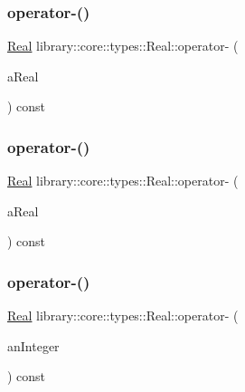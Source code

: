 \subsubsection{\texorpdfstring{operator-\/()}{operator-()}\hspace{0.1cm}{\footnotesize\ttfamily [1/4]}}
{\footnotesize\ttfamily \hyperlink{classlibrary_1_1core_1_1types_1_1_real}{Real} library\+::core\+::types\+::\+Real\+::operator-\/ (\begin{DoxyParamCaption}\item[{const \hyperlink{classlibrary_1_1core_1_1types_1_1_real}{Real} \&}]{a\+Real }\end{DoxyParamCaption}) const}

\mbox{\label{classlibrary_1_1core_1_1types_1_1_real_a45eecda19bb915f419b13c9441b65876}} 
\subsubsection{\texorpdfstring{operator-\/()}{operator-()}\hspace{0.1cm}{\footnotesize\ttfamily [2/4]}}
{\footnotesize\ttfamily \hyperlink{classlibrary_1_1core_1_1types_1_1_real}{Real} library\+::core\+::types\+::\+Real\+::operator-\/ (\begin{DoxyParamCaption}\item[{const \hyperlink{classlibrary_1_1core_1_1types_1_1_real_a9c5c8826b7e5a8e39544d23fea6c0e1c}{Real\+::\+Value\+Type} \&}]{a\+Real }\end{DoxyParamCaption}) const}

\mbox{\label{classlibrary_1_1core_1_1types_1_1_real_acd8b13000f401601c123df6d248a3b7d}} 
\subsubsection{\texorpdfstring{operator-\/()}{operator-()}\hspace{0.1cm}{\footnotesize\ttfamily [3/4]}}
{\footnotesize\ttfamily \hyperlink{classlibrary_1_1core_1_1types_1_1_real}{Real} library\+::core\+::types\+::\+Real\+::operator-\/ (\begin{DoxyParamCaption}\item[{const \hyperlink{classlibrary_1_1core_1_1types_1_1_integer}{Integer} \&}]{an\+Integer }\end{DoxyParamCaption}) const}

